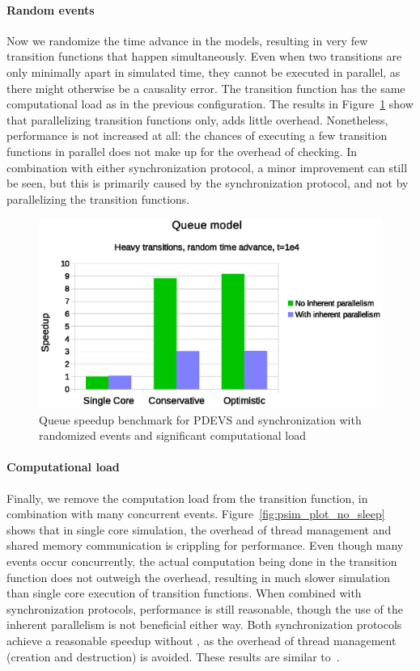\paragraph{Random events}
Now we randomize the time advance in the models, resulting in very few transition functions that happen simultaneously.
Even when two transitions are only minimally apart in simulated time, they cannot be executed in parallel, as there might otherwise be a causality error.
The transition function has the same computational load as in the previous configuration. 
The results in Figure~\ref{fig:psim_plot_random_sleep} show that parallelizing transition functions only, adds little overhead. 
Nonetheless, performance is not increased at all: the chances of executing a few transition functions in parallel does not make up for the overhead of checking.
In combination with either synchronization protocol, a minor improvement can still be seen, but this is primarily caused by the synchronization protocol, and not by parallelizing the transition functions.

\begin{figure}
	\center
	\includegraphics[width=\columnwidth]{fig/pdevs_random_sleep.eps}
	\caption{Queue speedup benchmark for PDEVS and synchronization with randomized events and significant computational load}
	\label{fig:psim_plot_random_sleep}
\end{figure}

\paragraph{Computational load}
Finally, we remove the computation load from the transition function, in combination with many concurrent events.
Figure~\ref{fig:psim_plot_no_sleep} shows that in single core simulation, the overhead of thread management and shared memory communication is crippling for performance.
Even though many events occur concurrently, the actual computation being done in the transition function does not outweigh the overhead, resulting in much slower simulation than single core execution of transition functions.
When combined with synchronization protocols, performance is still reasonable, though the use of the inherent parallelism is not beneficial either way.
Both synchronization protocols achieve a reasonable speedup without \pSim, as the overhead of thread management (creation and destruction) is avoided.
These results are similar to~\cite{Himmelspach}.
 
